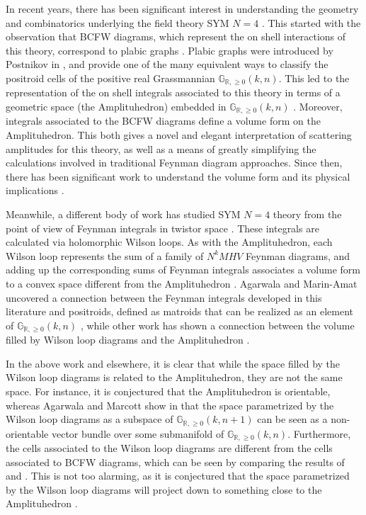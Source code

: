 \documentclass[11pt]{article}
\newcommand{\R}{\mathbb{R}}
\newcommand{\Gr}{\mathbb{G}_{\R, \geq 0}}
\theoremstyle{remark}
\theoremstyle{definition}
\begin{document}
In recent years, there has been significant interest in understanding the geometry and combinatorics underlying the field theory SYM $N=4$ \cite{wilsonloop, Arkani-Hamed:2013jha, Amplituhedronsquared, galashinlam, AmplituhedronDecomposition}. This started with the observation that BCFW diagrams, which represent the on shell interactions of this theory, correspond to plabic graphs \cite{GrassmannAmplitudebook}. Plabic graphs were introduced by Postnikov in \cite{Postnikov}, and provide one of the many equivalent ways to classify the positroid cells of the positive real Grassmannian $\Gr(k,n)$. This led to the representation of the on shell integrals associated to this theory in terms of a geometric space (the Amplituhedron) embedded in $\Gr(k,n)$ \cite{Arkani-Hamed:2013kca,Arkani-Hamed:2013jha}. Moreover, integrals associated to the BCFW diagrams define a volume form on the Amplituhedron. This both gives a novel and elegant interpretation of scattering amplitudes for this theory, as well as a means of greatly simplifying the calculations involved in traditional Feynman diagram approaches. Since then, there has been significant work to understand the volume form and its physical implications \cite{UnwindingAmplituhedron,galashinlam}.

Meanwhile, a different body of work has studied SYM $N=4$ theory from the point of view of Feynman integrals in twistor space \cite{Adamo:2011pv,Adamo:2012xe,  Boels:2007qn, Bullimore:2010pj}. These integrals are calculated via holomorphic Wilson loops. As with the Amplituhedron, each Wilson loop represents the sum of a family of $N^kMHV$ Feynman diagrams, and adding up the corresponding sums of Feynman integrals associates a volume form to a convex space different from the Amplituhedron \cite{Hodges2013}. Agarwala and Marin-Amat uncovered a connection between the Feynman integrals developed in this literature and positroids, defined  as matroids that can be realized as an element of $\Gr(k,n)$ \cite{wilsonloop}, while other work has shown a connection between the volume filled by Wilson loop diagrams and the Amplituhedron \cite{casestudy, Amplituhedronsquared}. 

In the above work and elsewhere, it is clear that while the space filled by the Wilson loop diagrams is related to the Amplituhedron, they are not the same space. For instance, it is conjectured that the Amplituhedron is orientable, whereas Agarwala and Marcott show in \cite{non-orientable} that the space parametrized by the Wilson loop diagrams as a subspace of $\Gr(k, n+1)$ can be seen as a non-orientable vector bundle over some submanifold of $\Gr(k,n)$. Furthermore, the cells associated to the Wilson loop diagrams are different from the cells associated to BCFW diagrams, which can be seen by comparing the results of \cite{AmplituhedronDecomposition} and \cite{casestudy}. This is not too alarming, as it is conjectured that the space parametrized by the Wilson loop diagrams will project down to something close to the Amplituhedron \cite{wilsonloop, Amplituhedronsquared}. 
\end{document}
